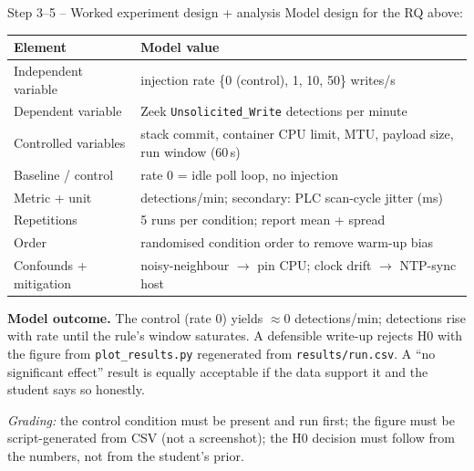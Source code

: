 \documentclass[11pt,a4paper]{article}
\begin{document}
\begin{solutionbox}{Step 3--5 -- Worked experiment design + analysis}
Model design for the RQ above:

\vspace{1mm}
{\footnotesize
\begin{tabular}{@{}p{4.0cm}p{11.2cm}@{}}
\toprule
\textbf{Element} & \textbf{Model value} \\
\midrule
Independent variable   & injection rate \{0 (control), 1, 10, 50\} writes/s \\
Dependent variable     & Zeek \texttt{Unsolicited\_Write} detections per minute \\
Controlled variables   & stack commit, container CPU limit, MTU, payload size, run window (60\,s) \\
Baseline / control     & rate 0 = idle poll loop, no injection \\
Metric + unit          & detections/min; secondary: PLC scan-cycle jitter (ms) \\
Repetitions            & 5 runs per condition; report mean + spread \\
Order                  & randomised condition order to remove warm-up bias \\
Confounds + mitigation & noisy-neighbour $\to$ pin CPU; clock drift $\to$ NTP-sync host \\
\bottomrule
\end{tabular}}

\vspace{1mm}
\textbf{Model outcome.} The control (rate 0) yields $\approx$0
detections/min; detections rise with rate until the rule's window
saturates. A defensible write-up rejects H0 with the figure from
\texttt{plot\_results.py} regenerated from \texttt{results/run.csv}.
A ``no significant effect'' result is equally acceptable if the data
support it and the student says so honestly.

\vspace{1mm}
\emph{Grading:} the control condition must be present and run first;
the figure must be script-generated from CSV (not a screenshot); the
H0 decision must follow from the numbers, not from the student's prior.
\end{solutionbox}
\end{document}
